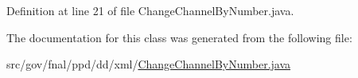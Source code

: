 Definition at line 21 of file Change\-Channel\-By\-Number.\-java.



The documentation for this class was generated from the following file\-:\begin{DoxyCompactItemize}
\item 
src/gov/fnal/ppd/dd/xml/\hyperlink{ChangeChannelByNumber_8java}{Change\-Channel\-By\-Number.\-java}\end{DoxyCompactItemize}
